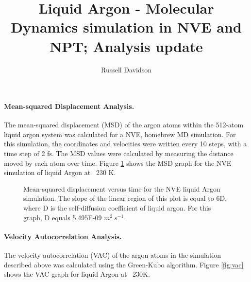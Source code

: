 \documentclass[12pt, letterpaper]{article}
\title{Liquid Argon - Molecular Dynamics simulation in NVE and NPT; Analysis update}
\author{Russell Davidson}
\begin{document}
\thispagestyle{empty}
\maketitle

\paragraph{Mean-squared Displacement Analysis.}
The mean-squared displacement (MSD) of the argon atoms within the 512-atom liquid argon system was calculated for a NVE, homebrew MD simulation. For this simulation, the coordinates and velocities were written every 10 steps, with a time step of 2 fs. The MSD values were calculated by measuring the distance moved by each atom over time. Figure \ref{fig:msd} shows the MSD graph for the NVE simulation of liquid Argon at ~230 K. 

\begin{figure} [p]
	\centering
	\caption{ Mean-squared displacement versus time for the NVE liquid Argon simulation. The slope of the linear region of this plot is equal to 6D, where D is the self-diffusion coefficient of liquid argon. For this graph, D equals 5.495E-09 $m^{2}\ s^{-1}$.} 
	\label{fig:msd}
\end{figure}

\paragraph{Velocity Autocorrelation Analysis.}
The velocity autocorrelation (VAC) of the argon atoms in the simulation described above was calculated using the Green-Kubo algorithm. Figure \ref{fig:vac} shows the VAC graph for liquid Argon at ~230K.
\end{document}
